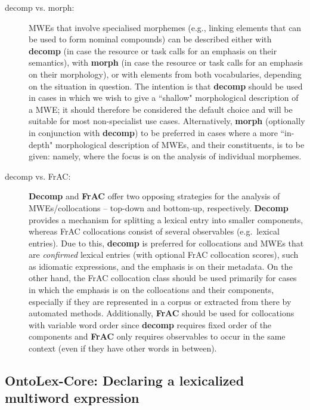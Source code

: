 \documentclass[output=paper,colorlinks,citecolor=brown]{langscibook}
\begin{document}
\begin{description}
\item[decomp vs. morph:] MWEs that involve specialised morphemes (e.g., linking elements that can be used to form nominal compounds) can be described either with \textbf{decomp} (in case the resource or task calls for an emphasis on their semantics), with \textbf{morph} (in case the resource or task calls for an emphasis on their morphology), or with elements from both vocabularies, depending on the situation in question. The intention is that \textbf{decomp} should be used in cases in which we wish to give a ``shallow" morphological description of a MWE; it should therefore be considered the default choice and will be suitable for most non-specialist use cases. Alternatively,
\textbf{morph} %
(optionally in conjunction with \textbf{decomp}) to be preferred in cases where a more ``in-depth" morphological description of MWEs, and their constituents, is to be given: namely, where the focus is on the analysis of individual morphemes.

\item[decomp vs. FrAC:] \textbf{Decomp} and \textbf{FrAC} offer two opposing strategies for the analysis of MWEs/collocations – top-down and bottom-up, respectively. \textbf{Decomp} provides a mechanism for splitting a lexical entry into smaller components, whereas FrAC collocations consist of several observables (e.g.~lexical entries). Due to this, \textbf{decomp} is preferred for collocations and MWEs that are \emph{confirmed} lexical entries (with optional FrAC collocation scores), such as idiomatic expressions, and the emphasis is on their metadata. On the other hand, the FrAC collocation class should be used primarily for cases in which the emphasis is on the collocations and their components, especially if they are represented in a corpus or extracted from there by automated methods. Additionally, \textbf{FrAC} should be used for collocations with variable word order since \textbf{decomp} requires fixed order of the components and \textbf{FrAC} only requires observables to occur in the same context (even if they have other words in between).
\end{description}

\subsection{OntoLex-Core: Declaring a lexicalized multiword expression} %
\label{ssec-mwe-lemon}
\end{document}
